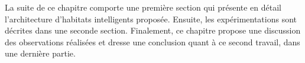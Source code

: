 La suite de ce chapitre comporte une première section qui présente en détail l'architecture d'habitats intelligents proposée. Ensuite, les expérimentations sont décrites dans une seconde section. Finalement, ce chapitre propose une discussion des observations réalisées et dresse une conclusion quant à ce second travail, dans une dernière partie.


